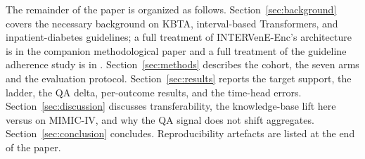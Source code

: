 The remainder of the paper is organized as follows.
Section~\ref{sec:background} covers the necessary background on KBTA,
interval-based Transformers, and inpatient-diabetes guidelines; a full
treatment of INTERVenE-Enc's architecture is in the companion methodological
paper \citep{oded2027intervene} and a full treatment of the guideline
adherence study is in \citep{oded2027kineret-jbi}. Section~\ref{sec:methods}
describes the cohort, the seven arms and the evaluation protocol.
Section~\ref{sec:results} reports the target support, the ladder, the QA
delta, per-outcome results, and the time-head errors. Section~\ref{sec:discussion}
discusses transferability, the knowledge-base lift here versus on MIMIC-IV,
and why the QA signal does not shift aggregates. Section~\ref{sec:conclusion}
concludes. Reproducibility artefacts are listed at the end of the paper.
